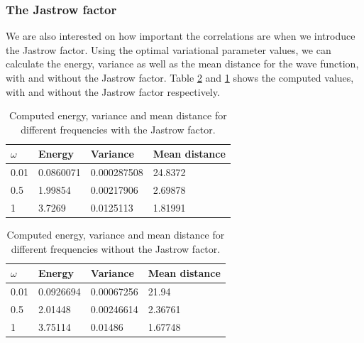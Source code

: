 \documentclass[12pt]{article}
\begin{document}
\subsubsection{The Jastrow factor}
We are also interested on how important the correlations are when we introduce the Jastrow factor. Using the optimal variational parameter values, we can calculate the energy, variance as well as the mean distance for the wave function, with and without the Jastrow factor. Table \ref{table:Non-Jastrow-Result} and \ref{table:Jastrow-Result} shows the computed values, with and without the Jastrow factor respectively.

\begin{table}
\begin{center}
	\begin{tabular}{| l | l | l | l |}
	\hline
	 $\omega$ & Energy & Variance & Mean distance \\ \hline
	 0.01 & 0.0860071 & 0.000287508 & 24.8372 \\
	 0.5 & 1.99854 & 0.00217906 & 2.69878 \\
	 1 & 3.7269 & 0.0125113 & 1.81991 \\ \hline
	\end{tabular}
\caption{Computed energy, variance and mean distance for different frequencies with the Jastrow factor.}
\end{center}
\label{table:Jastrow-Result}
\end{table}

\begin{table}
\begin{center}
	\begin{tabular}{| l | l | l | l |}
	\hline
	 $\omega$ & Energy & Variance & Mean distance \\ \hline
	 0.01 & 0.0926694 & 0.00067256 & 21.94 \\
	 0.5 & 2.01448 & 0.00246614 & 2.36761 \\
	 1 & 3.75114 & 0.01486 & 1.67748 \\ \hline
	\end{tabular}
\caption{Computed energy, variance and mean distance for different frequencies without the Jastrow factor.}
\end{center}
\label{table:Non-Jastrow-Result}
\end{table}
\FloatBarrier
\end{document}
